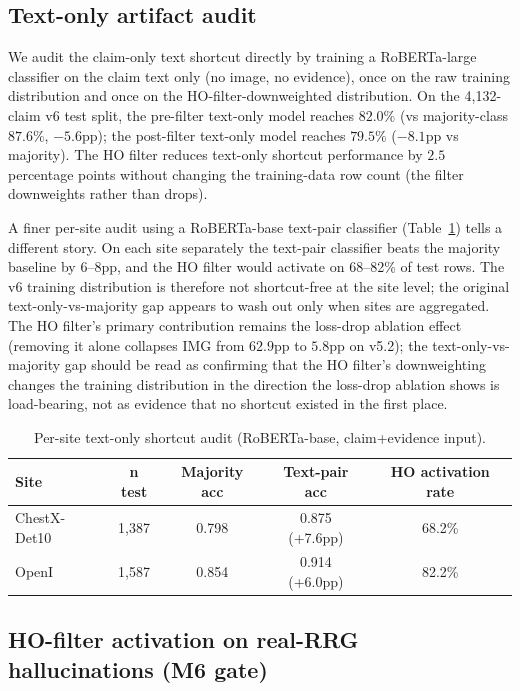 \documentclass[pmlr]{jmlr}
\begin{document}
\subsection{Text-only artifact audit}
\label{sec:artifact-audit}

We audit the claim-only text shortcut directly by training a RoBERTa-large classifier on the claim text only (no image, no evidence), once on the raw training distribution and once on the HO-filter-downweighted distribution. On the 4{,}132-claim v6 test split, the pre-filter text-only model reaches $82.0\%$ (vs majority-class $87.6\%$, $-5.6$pp); the post-filter text-only model reaches $79.5\%$ ($-8.1$pp vs majority). The HO filter reduces text-only shortcut performance by $2.5$ percentage points without changing the training-data row count (the filter downweights rather than drops).

A finer per-site audit using a RoBERTa-base text-pair classifier (Table~\ref{tab:cross-site-shortcut}) tells a different story. On each site separately the text-pair classifier beats the majority baseline by 6--8pp, and the HO filter would activate on 68--82\% of test rows. The v6 training distribution is therefore not shortcut-free at the site level; the original text-only-vs-majority gap appears to wash out only when sites are aggregated. The HO filter's primary contribution remains the loss-drop ablation effect (removing it alone collapses IMG from $62.9$pp to $5.8$pp on v5.2); the text-only-vs-majority gap should be read as confirming that the HO filter's downweighting changes the training distribution in the direction the loss-drop ablation shows is load-bearing, not as evidence that no shortcut existed in the first place.

\begin{table}[t]
\centering
\small
\caption{Per-site text-only shortcut audit (RoBERTa-base, claim+evidence input).}
\label{tab:cross-site-shortcut}
\begin{tabular}{lcccc}
\toprule
\textbf{Site} & \textbf{n test} & \textbf{Majority acc} & \textbf{Text-pair acc} & \textbf{HO activation rate} \\
\midrule
ChestX-Det10 & 1{,}387 & 0.798 & 0.875 (+7.6pp) & 68.2\% \\
OpenI        & 1{,}587 & 0.854 & 0.914 (+6.0pp) & 82.2\% \\
\bottomrule
\end{tabular}
\end{table}

\subsection{HO-filter activation on real-RRG hallucinations (M6 gate)}
\label{sec:ho-rrg}
\end{document}
